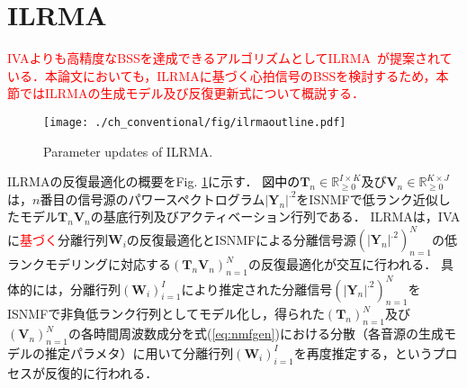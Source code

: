 \section{ILRMA}
\label{sec:conv:ilrma}

\textcolor{red}{IVAよりも高精度なBSSを達成できるアルゴリズムとしてILRMA~\cite{ILRMA, Kitamura2018_ilrma}が提案されている．本論文においても，ILRMAに基づく心拍信号のBSSを検討するため，本節ではILRMAの生成モデル及び反復更新式について概説する．}

\begin{figure}[!t]
\centering
\texttt{[image: ./ch\_conventional/fig/ilrmaoutline.pdf]}
\caption{Parameter updates of ILRMA.}
\label{fig:ilrma_outline}
\end{figure}

ILRMAの反復最適化の概要をFig. \ref{fig:ilrma_outline}に示す．
\textcolor{black}{図中の}$\bm{T}_n\in\mathbb{R}_{\geq 0}^{I\times K}$及び$\bm{V}_n\in\mathbb{R}_{\geq 0}^{K\times J}$は，$n$番目の信号源のパワースペクトログラム$|\bm{Y}_n|^{.2}$をISNMFで低ランク近似したモデル$\bm{T}_n\bm{V}_n$の基底行列及びアクティベーション行列である．
ILRMAは，IVAに\textcolor{red}{基づく}分離行列$\bm{W}_i$の反復最適化とISNMFによる分離信号源$( |\bm{Y}_n|^{.2} )_{n=1}^N$の低ランクモデリングに対応する$( \bm{T}_n\bm{V}_n )_{n=1}^N$の反復最適化が交互に行われる．
具体的には，分離行列$( \bm{W}_i )_{i=1}^I$により推定された分離信号$( |\bm{Y}_n|^{.2} )_{n=1}^N$をISNMFで非負低ランク行列としてモデル化し，得られた$( \bm{T}_n )_{n=1}^N$及び$( \bm{V}_n )_{n=1}^N$の各時間周波数成分を式(\ref{eq:nmfgen})における分散（各音源の生成モデルの推定パラメタ）に用いて分離行列$( \bm{W}_i )_{i=1}^I$を再度推定する，というプロセスが反復的に行われる．

